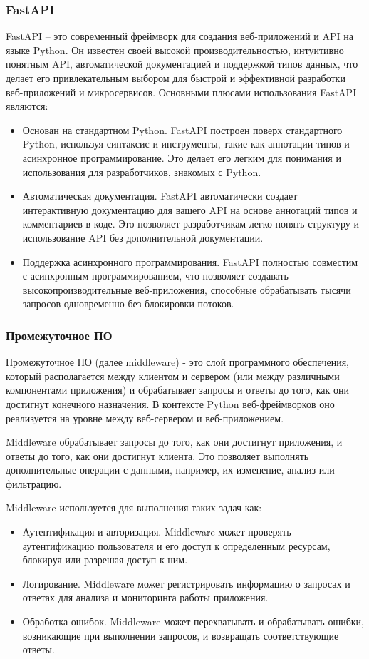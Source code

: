 \subsubsection{FastAPI}\label{subsubsec:domain:fastapi}
FastAPI -- это современный фреймворк для создания веб-приложений и API на языке Python.
Он известен своей высокой производительностью, интуитивно понятным API, автоматической документацией и поддержкой типов данных, что делает его привлекательным выбором для быстрой и эффективной разработки веб-приложений и микросервисов.
Основными плюсами использования FastAPI являются:
\begin{itemize}
    \item Основан на стандартном Python.
    FastAPI построен поверх стандартного Python, используя синтаксис и инструменты, такие как аннотации типов и асинхронное программирование.
    Это делает его легким для понимания и использования для разработчиков, знакомых с Python.
    \item Автоматическая документация.
    FastAPI автоматически создает интерактивную документацию для вашего API на основе аннотаций типов и комментариев в коде.
    Это позволяет разработчикам легко понять структуру и использование API без дополнительной документации.
    \item Поддержка асинхронного программирования.
    FastAPI полностью совместим с асинхронным программированием, что позволяет создавать высокопроизводительные веб-приложения, способные обрабатывать тысячи запросов одновременно без блокировки потоков.
\end{itemize}

\subsubsection{Промежуточное ПО}\label{subsubsec:domain:middleware}
Промежуточное ПО (далее middleware) - это слой программного обеспечения, который располагается между клиентом и сервером (или между различными компонентами приложения) и обрабатывает запросы и ответы до того, как они достигнут конечного назначения.
В контексте Python веб-фреймворков оно реализуется на уровне между веб-сервером и веб-приложением.

Middleware обрабатывает запросы до того, как они достигнут приложения, и ответы до того, как они достигнут клиента.
Это позволяет выполнять дополнительные операции с данными, например, их изменение, анализ или фильтрацию.

Middleware используется для выполнения таких задач как:
\begin{itemize}
    \item Аутентификация и авторизация.
    Middleware может проверять аутентификацию пользователя и его доступ к определенным ресурсам, блокируя или разрешая доступ к ним.
    \item Логирование.
    Middleware может регистрировать информацию о запросах и ответах для анализа и мониторинга работы приложения.
    \item Обработка ошибок.
    Middleware может перехватывать и обрабатывать ошибки, возникающие при выполнении запросов, и возвращать соответствующие ответы.
\end{itemize}

